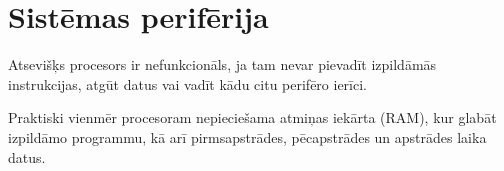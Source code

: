 \documentclass[12pt,a4paper]{article} %
\begin{document}
	\pagestyle{empty}
	
	\renewcommand{\contentsname}%
		{\vspace*{-12mm}\section*{Saturs}\vspace*{-6mm}}
	\tableofcontents
	
	\clearpage
	\pagestyle{plain}
	\onehalfspacing %
	
	
	
	\clearpage
	
	\clearpage
	\section{Sistēmas perifērija}
	Atsevišķs procesors ir nefunkcionāls, ja tam nevar pievadīt izpildāmās
	instrukcijas, atgūt datus vai vadīt kādu citu perifēro ierīci.
	
	Praktiski vienmēr procesoram nepieciešama atmiņas iekārta (RAM), kur
	glabāt izpildāmo programmu, kā arī pirmsapstrādes, pēcapstrādes un 
	apstrādes laika datus.
	
\end{document}
